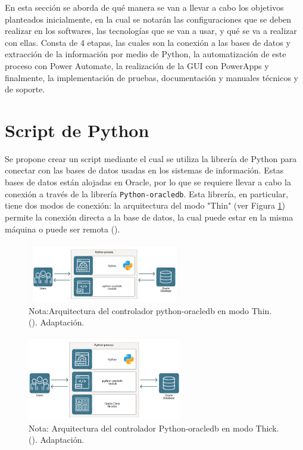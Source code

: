 \documentclass[letter,oneside,12pt,spanish]{report}
\begin{document}
\noindent En esta sección se aborda de qué manera se van a llevar a cabo los objetivos planteados inicialmente, en la cual se notarán las configuraciones que se deben realizar en los softwares, las tecnologías que se van a usar, y qué se va a realizar con ellas. Consta de 4 etapas, las cuales son la conexión a las bases de datos y extracción de la información por medio de Python, la automatización de este proceso con Power Automate, la realización de la GUI con PowerApps y finalmente, la implementación de pruebas, documentación y manuales técnicos y de soporte. 


\section{Script de Python}

\noindent Se propone crear un script mediante el cual se utiliza la librería de Python para conectar con las bases de datos usadas en los sistemas de información. Estas bases de datos están alojadas en Oracle, por lo que se requiere llevar a cabo la conexión a través de la librería \texttt{Python-oracledb}. Esta librería, en particular, tiene dos modos de conexión: la arquitectura del modo "Thin" (ver Figura \ref{fig:modothini}) permite la conexión directa a la base de datos, la cual puede estar en la misma máquina o puede ser remota (\cite{oracle2024python}).


\begin{figure}[ht]
    \centering
    \includegraphics[width=0.6\textwidth]{Figs/modo thin.png}
    \label{fig:modothini}
    \\Nota:Arquitectura del controlador python-oracledb en modo Thin. (\cite{oracle2024python}). Adaptación.
\end{figure}

\begin{figure}[ht]
    \centering
    \includegraphics[width=0.6\textwidth]{Figs/modo thick.png}
    \label{fig:modothick}
    \\Nota:  Arquitectura del controlador Python-oracledb en modo Thick. (\cite{oracle2024python}). Adaptación.
\end{figure}
\end{document}
